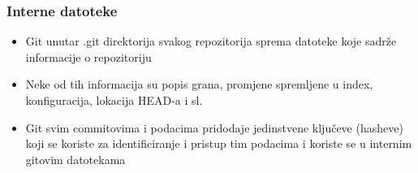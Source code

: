\begin{frame}
    \frametitle{Interne datoteke}
    \begin{itemize}
        \item{Git unutar .git direktorija svakog repozitorija sprema datoteke koje sadrže informacije o repozitoriju}
        \item{Neke od tih informacija su popis grana, promjene spremljene u index, konfiguracija, lokacija HEAD-a i sl.}
        \item{Git svim commitovima i podacima pridodaje jedinstvene ključeve (hasheve) koji se koriste za identificiranje i pristup tim podacima i koriste se u internim gitovim datotekama}
    \end{itemize}
\end{frame}